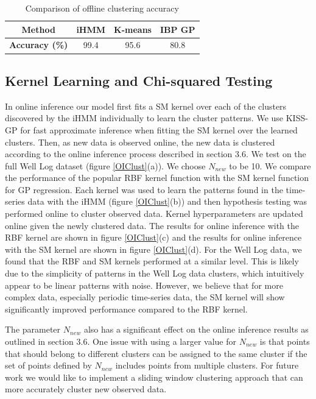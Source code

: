 \documentclass{article}
\begin{document}
\begin{table}[]
\centering
\caption{Comparison of offline clustering accuracy}
\label{OFACC}
\begin{tabular}{|c|c|c|c|}
\hline
\textbf{Method}        & iHMM & K-means & IBP GP \\ \hline
\textbf{Accuracy (\%)} & 99.4 & 95.6    & 80.8   \\ \hline
\end{tabular}
\end{table}

\subsection{Kernel Learning and Chi-squared Testing}

In online inference our model first fits a SM kernel over each of the clusters discovered by the iHMM individually to learn the cluster patterns. We use KISS-GP for fast approximate inference when fitting the SM kernel over the learned clusters. Then, as new data is observed online, the new data is clustered according to the online inference process described in section 3.6. We test on the full Well Log dataset (figure \ref{OIClust}(a)). We choose $N_{new}$ to be 10. We compare the performance of the popular RBF kernel function with the SM kernel function for GP regression. Each kernel was used to learn the patterns found in the time-series data with the iHMM (figure \ref{OIClust}(b)) and then hypothesis testing was performed online to cluster observed data. Kernel hyperparameters are updated online given the newly clustered data. The results for online inference with the RBF kernel are shown in figure \ref{OIClust}(c) and the results for online inference with the SM kernel are shown in figure \ref{OIClust}(d). For the Well Log data, we found that the RBF and SM kernels performed at a similar level. This is likely due to the simplicity of patterns in the Well Log data clusters, which intuitively appear to be linear patterns with noise. However, we believe that for more complex data, especially periodic time-series data, the SM kernel will show significantly improved performance compared to the RBF kernel. 

The parameter $N_{new}$ also has a significant effect on the online inference results as outlined in section 3.6. One issue with using a larger value for $N_{new}$ is that points that should belong to different clusters can be assigned to the same cluster if the set of points defined by $N_{new}$ includes points from multiple clusters. For future work we would like to implement a sliding window clustering approach that can more accurately cluster new observed data.
\end{document}
